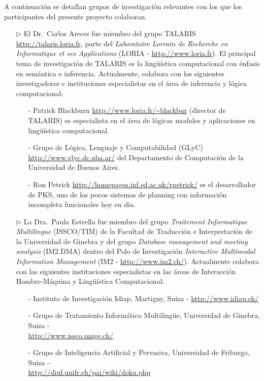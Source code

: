 A continuaci\'on se detallan grupos de investigaci\'on relevantes con los que los  participantes del presente proyecto colaboran.


\begin{itemize}
    \item[$\triangleright$] El Dr.\ Carlos Areces fue miembro
del grupo TALARIS \url{http://talaris.loria.fr}, parte del
\emph{Laboratoire Lorrain de Recherche en Informatique et ses Applications} (LORIA - \url{http://www.loria.fr}). El principal tema de investigaci\'on de TALARIS es la ling\"u\'istica computacional con \'enfasis en sem\'antica e inferencia. Actualmente, colabora con los siguientes investigadores e instituciones especialistas en el \'area de inferencia y l\'ogica computacional:

\begin{itemize}
    \item[-]  Patrick Blackburn \url{http://www.loria.fr/~blackbur} (director de TALARIS) es especialista en el \'area de l\'ogicas modales y aplicaciones
en ling\"u\'istica computacional.
\item[-] Grupo de L\'ogica, Lenguaje y Computabilidad (GLyC) \url{http://www.glyc.dc.uba.ar/} del Departamento de Computaci\'on de la Universidad
de Buenos Aires.
\item[-] Ron Petrick \url{http://homepages.inf.ed.ac.uk/rpetrick/} es el
desarrollador de PKS, uno de los pocos sistemas de planning con informaci\'on
incompleta funcionales hoy en d\'ia.
\end{itemize}

\item[$\triangleright$] La Dra.\ Paula Estrella fue miembro del grupo \emph{Traitement 
Informatique Multilingue} (ISSCO/TIM) de la Facultad de Traducci\'on e Interpretaci\'on 
de la Universidad de Ginebra y del grupo \emph{Database management and meeting analysis} 
(IM2.DMA) dentro del Polo de Investigaci\'on \emph{Interactive Multimodal Information 
Management} (IM2 - \url{http://www.im2.ch/}). Actualmente colabora con las siguientes 
instituciones especialistas en las \'areas de Interacci\'on Hombre-M\'aquina y  Ling\"u\'is\-tica Computacional:
\begin{itemize}
\item[-]  Instituto de Investigaci\'on Idiap, Martigny, Suiza -  \url{http://www.idiap.ch/}
\item[-] Grupo de Tratamiento Inform\'atico Multiling\"ue, Universidad de Ginebra, Suiza - \\ \url{http://www.issco.unige.ch/}
\item[-]  Grupo de Inteligencia Artificial y Pervasiva, Universidad de Friburgo, Suiza - \\ \url{http://diuf.unifr.ch/pai/wiki/doku.php}
\end{itemize}


\end{itemize}
